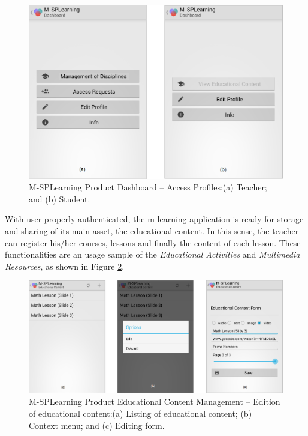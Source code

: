 \begin{figure}[!ht]
\centering
\includegraphics[scale=0.325]{figures/section3/MSPLDashboardApp}
\caption{M-SPLearning Product Dashboard -- Access Profiles:\newline(a) Teacher; and (b) Student.}
\label{figureMSPLDashboardApp}
\end{figure}

With user properly authenticated, the m-learning application is ready for storage and sharing of its main asset, the educational content. In this sense, the teacher can register his/her courses, lessons and finally the content of each lesson. These functionalities are an usage sample of the \textit{Educational Activities} and \textit{Multimedia Resources}, as shown in Figure \ref{figureMSPLEducationalContent}.

\begin{figure}[!ht]
\centering
\includegraphics[scale=0.325]{figures/section3/MSPLEducationalContent}
\caption{M-SPLearning Product Educational Content Management -- Edition of educational content:\newline(a) Listing of educational content; (b) Context menu; and (c) Editing form.}
\label{figureMSPLEducationalContent}
\end{figure}

